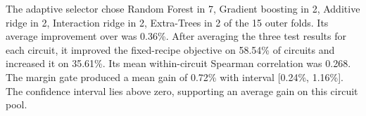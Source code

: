 The adaptive selector chose Random Forest in 7, Gradient boosting in 2, Additive ridge in 2, Interaction ridge in 2, Extra-Trees in 2 of the 15 outer folds. Its average improvement over  was 0.36\%. After averaging the three test results for each circuit, it improved the fixed-recipe objective on 58.54\% of circuits and increased it on 35.61\%. Its mean within-circuit Spearman correlation was 0.268. The margin gate produced a mean gain of 0.72\% with interval [0.24\%, 1.16\%]. The confidence interval lies above zero, supporting an average gain on this circuit pool.
